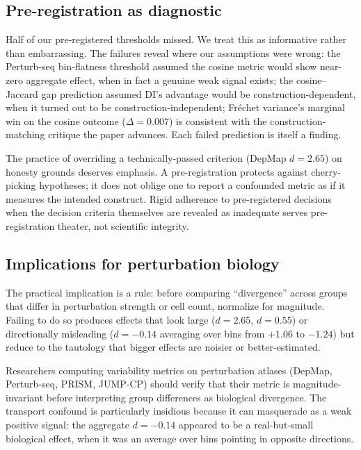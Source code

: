 \documentclass[11pt]{article}
\begin{document}
\subsection{Pre-registration as diagnostic}

Half of our pre-registered thresholds missed. We treat this as
informative rather than embarrassing. The failures reveal where our
assumptions were wrong: the Perturb-seq bin-flatness threshold assumed
the cosine metric would show near-zero aggregate effect, when in fact a
genuine weak signal exists; the cosine--Jaccard gap prediction assumed
DI's advantage would be construction-dependent, when it turned out to
be construction-independent; Fr\'{e}chet variance's marginal win on the
cosine outcome ($\Delta = 0.007$) is consistent with the
construction-matching critique the paper advances. Each failed
prediction is itself a finding.

The practice of overriding a technically-passed criterion (DepMap $d =
2.65$) on honesty grounds deserves emphasis. A pre-registration
protects against cherry-picking hypotheses; it does not oblige one to
report a confounded metric as if it measures the intended construct.
Rigid adherence to pre-registered decisions when the decision criteria
themselves are revealed as inadequate serves pre-registration theater,
not scientific integrity.

\subsection{Implications for perturbation biology}

The practical implication is a rule: before comparing ``divergence''
across groups that differ in perturbation strength or cell count,
normalize for magnitude. Failing to do so produces effects that look
large ($d = 2.65$, $d = 0.55$) or directionally misleading ($d = -0.14$
averaging over bins from $+1.06$ to $-1.24$) but reduce to the
tautology that bigger effects are noisier or better-estimated.

Researchers computing variability metrics on perturbation atlases
(DepMap, Perturb-seq, PRISM, JUMP-CP) should verify that their metric is
magnitude-invariant before interpreting group differences as biological
divergence. The transport confound is particularly insidious because it
can masquerade as a weak positive signal: the aggregate $d = -0.14$
appeared to be a real-but-small biological effect, when it was an
average over bins pointing in opposite directions.
\end{document}
